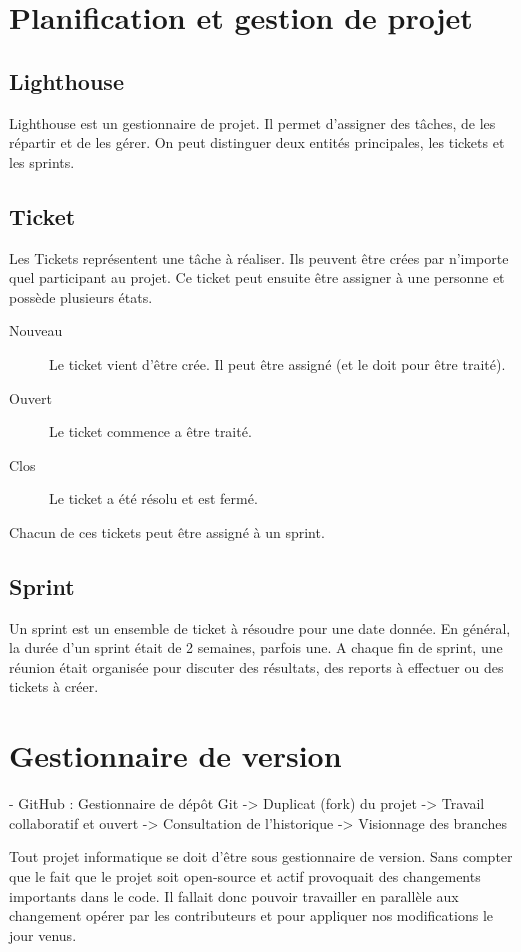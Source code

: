 \section{Planification et gestion de projet}
\subsection{Lighthouse}
Lighthouse est un gestionnaire de projet. Il permet d'assigner des tâches, de les répartir et de les gérer. On peut distinguer deux entités principales, les tickets et les sprints.
\subsection{Ticket}
Les Tickets représentent une tâche à réaliser. Ils peuvent être crées par n'importe quel participant au projet. Ce ticket peut ensuite être assigner à une personne et possède plusieurs états.
\begin{description}
\item[Nouveau] Le ticket vient d'être crée. Il peut être assigné (et le doit pour être traité).
\item[Ouvert] Le ticket commence a être traité.
\item[Clos] Le ticket a été résolu et est fermé.
\end{description}
Chacun de ces tickets peut être assigné à un sprint.
\subsection{Sprint}
Un sprint est un ensemble de ticket à résoudre pour une date donnée. En général, la durée d'un sprint était de 2 semaines, parfois une. A chaque fin de sprint, une réunion était organisée pour discuter des résultats, des reports à effectuer ou des tickets à créer.
\section{Gestionnaire de version}

- GitHub : Gestionnaire de dépôt Git
-> Duplicat (fork) du projet
-> Travail collaboratif et ouvert 
-> Consultation de l'historique
-> Visionnage des branches

Tout projet informatique se doit d'être sous gestionnaire de version. Sans compter que le fait que le projet soit open-source et actif provoquait des changements importants dans le code. Il fallait donc pouvoir travailler en parallèle aux changement opérer par les contributeurs et pour appliquer nos modifications le jour venus.

